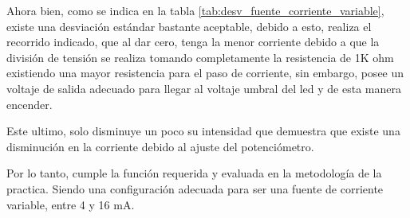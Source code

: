 \begin{itemize}
                Ahora bien, como se indica en la tabla \ref{tab:desv_fuente_corriente_variable}, existe una desviación estándar bastante aceptable, debido a esto, realiza el recorrido indicado, que al dar cero, tenga la menor corriente debido a que  la división de tensión se realiza tomando completamente la resistencia de 1K ohm existiendo una mayor resistencia para el paso de corriente, sin embargo, posee un voltaje de salida adecuado para llegar al voltaje umbral del led y de esta manera encender.

                Este ultimo, solo disminuye un poco su intensidad que demuestra que existe una disminución en la corriente debido al ajuste del potenciómetro. 

                Por lo tanto, cumple la función requerida y evaluada en la metodología de la practica. Siendo una configuración adecuada para ser una fuente de corriente variable, entre 4 y 16 mA.
        \end{itemize}
    


\newpage
